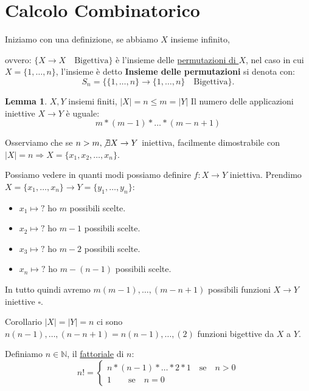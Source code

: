 \documentclass{article}
\theoremstyle{definition}
\newtheorem{lemma}{Lemma}[section]
\begin{document}
\newpage
\section{Calcolo Combinatorico}

Iniziamo con una definizione, se abbiamo $X$ insieme infinito, \par ovvero: $\{X \to X \quad \mbox{Bigettiva}\}$ è l'insieme delle \underline{permutazioni di $X$}, nel caso in cui $X = \{1,\ldots, n\}$, l'insieme è detto \textbf{Insieme delle permutazioni} si denota con:
\begin{equation*}
        S_n = \{\{1,\ldots, n\} \to \{ 1,\ldots,n\} \quad \mbox{Bigettiva}\}.
\end{equation*}

\begin{lemma}
$X,Y$ insiemi finiti, $|X| = n \le m = |Y|$ Il numero delle applicazioni iniettive $X \to Y$ è uguale:
\begin{equation*}
        m * (m-1)*\ldots*(m-n+1)
\end{equation*}
\end{lemma}

Osserviamo che se $n > m, \not \exists X \to Y$ iniettiva, facilmente dimostrabile con $|X| = n \Rightarrow X = \{x_1,x_2,\ldots,x_n\}$. \par
Possiamo vedere in quanti modi possiamo definire $f:X \to Y$ iniettiva. 
Prendimo $X = \{x_1,\ldots,x_n\} \to Y = \{y_1,\ldots,y_n\}$:
\begin{itemize}
        \item $x_1 \mapsto \mbox{?}$ ho $m$ possibili scelte.
        \item $x_2 \mapsto \mbox{?}$ ho $m-1$ possibili scelte.
        \item $x_3 \mapsto \mbox{?}$ ho $m-2$ possibili scelte.
        \item $x_n \mapsto \mbox{?}$ ho $m-(n-1)$ possibili scelte.
\end{itemize}

In tutto quindi avremo $m(m-1),\ldots,(m-n+1)$ possibili funzioni $X \to Y$ iniettive $\square$. \par

Corollario $|X| = |Y| = n$ ci sono $n(n-1),\ldots,(n-n+1) = n(n-1),\ldots,(2)$ funzioni bigettive da $X$ a $Y$. \par
Definiamo $n \in \mathbb{N}$, il \underline{fattoriale} di $n$:
\[ n! = 
\begin{cases}
        n * (n-1) * \ldots * 2 * 1 \quad \mbox{se} \quad n>0\\
        1 \quad \quad \mbox{se} \quad n = 0
\end{cases}
\]
\end{document}
